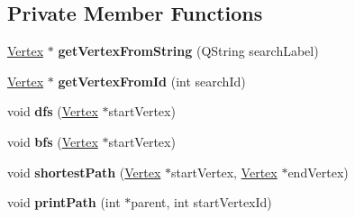 \subsection*{Private Member Functions}
\begin{DoxyCompactItemize}
\item 
\mbox{\label{class_graph_ab6bd9ab95bbe072fda0ddb83795fb162}} 
\hyperlink{struct_vertex}{Vertex} $\ast$ {\bfseries get\+Vertex\+From\+String} (Q\+String search\+Label)
\item 
\mbox{\label{class_graph_a2a44aa7aa4505fe778d29645699eb444}} 
\hyperlink{struct_vertex}{Vertex} $\ast$ {\bfseries get\+Vertex\+From\+Id} (int search\+Id)
\item 
\mbox{\label{class_graph_a7bad85e7d9146b225063067b1939ddd1}} 
void {\bfseries dfs} (\hyperlink{struct_vertex}{Vertex} $\ast$start\+Vertex)
\item 
\mbox{\label{class_graph_a05b4bca02d8d0426e49cea0b7e02edc4}} 
void {\bfseries bfs} (\hyperlink{struct_vertex}{Vertex} $\ast$start\+Vertex)
\item 
\mbox{\label{class_graph_aff3fe78620db11278f02b3aa94ef932c}} 
void {\bfseries shortest\+Path} (\hyperlink{struct_vertex}{Vertex} $\ast$start\+Vertex, \hyperlink{struct_vertex}{Vertex} $\ast$end\+Vertex)
\item 
\mbox{\label{class_graph_a5be4093f330007fc182078bd9aabe4ac}} 
void {\bfseries print\+Path} (int $\ast$parent, int start\+Vertex\+Id)
\end{DoxyCompactItemize}
